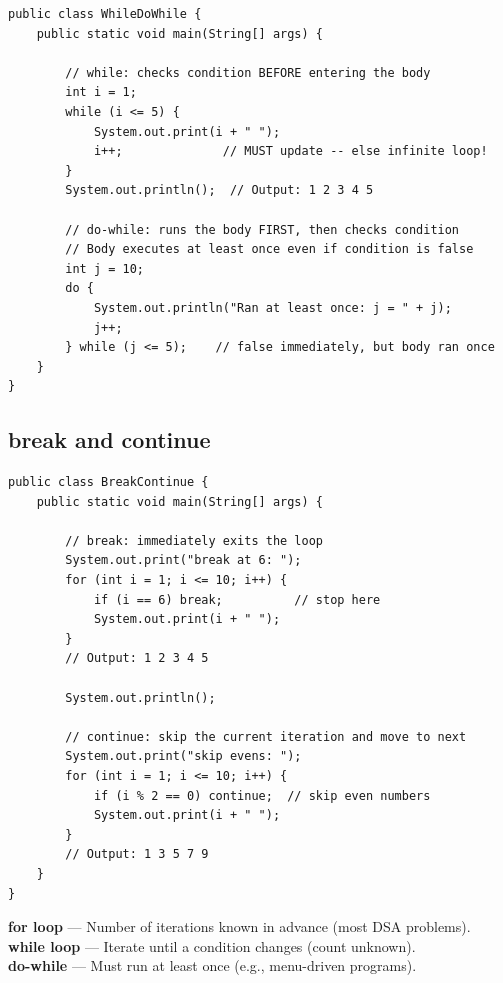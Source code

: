 \documentclass[12pt,a4paper,oneside]{book}
\begin{document}
\begin{lstlisting}[caption={while vs do-while --- key difference shown}]
public class WhileDoWhile {
    public static void main(String[] args) {

        // while: checks condition BEFORE entering the body
        int i = 1;
        while (i <= 5) {
            System.out.print(i + " ");
            i++;              // MUST update -- else infinite loop!
        }
        System.out.println();  // Output: 1 2 3 4 5

        // do-while: runs the body FIRST, then checks condition
        // Body executes at least once even if condition is false
        int j = 10;
        do {
            System.out.println("Ran at least once: j = " + j);
            j++;
        } while (j <= 5);    // false immediately, but body ran once
    }
}
\end{lstlisting}

\subsection{break and continue}

\begin{lstlisting}[caption={break exits the loop; continue skips the current iteration}]
public class BreakContinue {
    public static void main(String[] args) {

        // break: immediately exits the loop
        System.out.print("break at 6: ");
        for (int i = 1; i <= 10; i++) {
            if (i == 6) break;          // stop here
            System.out.print(i + " ");
        }
        // Output: 1 2 3 4 5

        System.out.println();

        // continue: skip the current iteration and move to next
        System.out.print("skip evens: ");
        for (int i = 1; i <= 10; i++) {
            if (i % 2 == 0) continue;  // skip even numbers
            System.out.print(i + " ");
        }
        // Output: 1 3 5 7 9
    }
}
\end{lstlisting}

\begin{tipbox}
\textbf{for loop} --- Number of iterations known in advance (most DSA problems).\\
\textbf{while loop} --- Iterate until a condition changes (count unknown).\\
\textbf{do-while} --- Must run at least once (e.g., menu-driven programs).
\end{tipbox}
\end{document}

